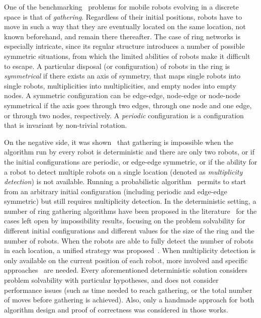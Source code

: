 \documentclass[envcountsame]{llncs} \usepackage[english]{babel}
\begin{document}
One of the benchmarking~\cite{FPS12b} problems for mobile robots evolving in a discrete space is that of \emph{gathering}. Regardless of their initial positions, robots have to move in such a way that they are eventually located on the same location, not known beforehand, and remain there thereafter. The case of ring networks is especially intricate, since its regular structure introduces a number of possible symmetric situations, from which the limited abilities of robots make it difficult to escape. A particular disposal (or configuration) of robots in the ring is \emph{symmetrical} if there exists an axis of symmetry, that maps single robots into single robots, multiplicities into multiplicities, and empty nodes into empty nodes. A symmetric configuration can be edge-edge, node-edge or node-node symmetrical if the axis goes through two edges, through one node and one edge, or through two nodes, respectively. A \emph{periodic} configuration is a configuration that is invariant by non-trivial rotation. 

On the negative side, it was shown~\cite{markou} that gathering is impossible when the algorithm run by every robot is deterministic and there are only two robots, or if the initial configurations are periodic, or edge-edge symmetric, or if the ability for a robot to detect multiple robots on a single location (denoted as \emph{multiplicity detection}) is not available. Running a probabilistic algorithm~\cite{OT12c} permits to start from an arbitrary initial configuration (including periodic and edge-edge symmetric) but still requires multiplicity detection. In the deterministic setting, a number of ring gathering algorithms have been proposed in the literature~\cite{KameiLOT12,navarradisc2012,navarraipdps2013,navarrasirocco2013,navarra2014} for the cases left open by impossibility results, focusing on the problem solvability for different initial configurations and different values for the size of the ring and the number of robots. When the robots are able to fully detect the number of robots in each location, a unified strategy was proposed~\cite{navarradisc2012}. When multiplicity detection is only available on the current position of each robot, more involved and specific approaches~\cite{IIKO10c,KameiLOT11,KameiLOT12,navarra2014} are needed. Every aforementioned deterministic solution considers problem solvability with particular hypotheses, and does not consider performance issues (such as time needed to reach gathering, or the total number of moves before gathering is achieved). Also, only a handmade approach for both algorithm design and proof of correctness was considered in those works.
\end{document}
